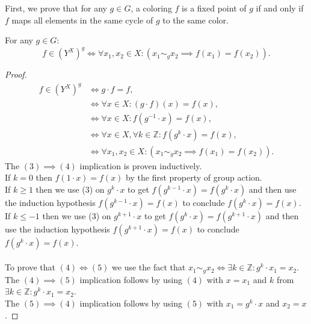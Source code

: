 First, we prove that for any $g \in G$, a coloring $f$ is a fixed point of $g$ if and only if $f$ maps all elements in the same cycle of $g$ to the same color.

\begin{proposition}
  \label{prop:f-mem-fixedBy-iff-forall-eq-to-eq}
  \leanok
  For any $g \in G$:
  \begin{equation*}
    f \in (Y^X)^g \iff \forall x_1, x_2 \in X: (x_1 \sim_g x_2 \implies f(x_1) = f(x_2)).
  \end{equation*}
\end{proposition}

\begin{proof}
  \leanok
  \begin{align}
    f \in (Y^X)^g &\iff g \cdot f = f, \\
                  &\iff \forall x \in X: (g \cdot f)(x) = f(x), \\
                  &\iff \forall x \in X: f(g^{-1} \cdot x) = f(x), \\
                  &\iff \forall x \in X, \forall k \in \mathbb{Z}: f(g^k \cdot x) = f(x), \\
                  &\iff \forall x_1, x_2 \in X: (x_1 \sim_g x_2 \implies f(x_1) = f(x_2)).
  \end{align}
  The $(3) \implies (4)$ implication is proven inductively.\\
  If $k = 0$ then $f(1 \cdot x) = f(x)$ by the first property of group action.\\
  If $k \geq 1$ then we use (3) on $g^{k} \cdot x$ to get $f(g^{k - 1} \cdot x) = f(g^k \cdot x)$ and then use the induction hypothesis $f(g^{k - 1} \cdot x) = f(x)$ to conclude $f(g^k \cdot x) = f(x)$.\\
  If $k \leq -1$ then we use (3) on $g^{k + 1} \cdot x$ to get $f(g^k \cdot x) = f(g^{k + 1} \cdot x)$ and then use the induction hypothesis $f(g^{k + 1} \cdot x) = f(x)$ to conclude $f(g^k \cdot x) = f(x)$.\\
  \\
  To prove that $(4) \iff (5)$ we use the fact that $x_1 \sim_g x_2 \iff \exists k \in \mathbb{Z}: g^k \cdot x_1 = x_2$.\\
  The $(4) \implies (5)$ implication follows by using $(4)$ with $x = x_1$ and $k$ from $\exists k \in \mathbb{Z}: g^k \cdot x_1 = x_2$.\\
  The $(5) \implies (4)$ implication follows by using $(5)$ with $x_1 = g^k \cdot x$ and $x_2 = x$.
\end{proof}

